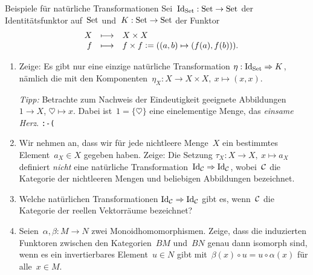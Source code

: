 \documentclass{uebblatt}
\begin{document}

\begin{aufgabe}{Beispiele für natürliche Transformationen}
Sei~$\mathrm{Id}_{\mathrm{Set}} : \mathrm{Set} \to \mathrm{Set}$ der Identitätsfunktor auf~$\mathrm{Set}$ und~$K : \mathrm{Set}
\to \mathrm{Set}$ der Funktor
\[ \begin{array}{@{}rrcl@{}}
  & X &\longmapsto& X \times X \\
  & f &\longmapsto& f \times f \defeq ((a,b) \mapsto (f(a),f(b))).
\end{array} \]
\begin{enumerate}
\item Zeige: Es gibt nur eine einzige natürliche Transformation $\eta : \mathrm{Id}_{\mathrm{Set}}
\Rightarrow K$, nämlich die mit den Komponenten~$\eta_X : X \to X \times X,\ x \mapsto (x,x)$.

{\tiny
\emph{Tipp:} Betrachte zum Nachweis der Eindeutigkeit geeignete Abbildungen $1 \to X$, $\heartsuit
\mapsto x$. Dabei ist~$1 = \{\heartsuit\}$ eine einelementige Menge, das
\emph{einsame Herz}. \texttt{:-(}\par}
\item Wir nehmen an, dass wir für jede nichtleere Menge~$X$ ein bestimmtes
Element~$a_X \in X$ gegeben haben. Zeige:
Die Setzung
$\tau_X : X \to X,\ x \mapsto a_X$
definiert \emph{nicht} eine natürliche Transformation~$\mathrm{Id}_{\mathcal{C}} \Rightarrow \mathrm{Id}_{\mathcal{C}}$,
wobei~$\mathcal{C}$ die Kategorie der nichtleeren Mengen und beliebigen Abbildungen
bezeichnet.
\item
Welche natürlichen Transformationen $\mathrm{Id}_{\mathcal{C}} \Rightarrow \mathrm{Id}_{\mathcal{C}}$ gibt es,
wenn~$\mathcal{C}$ die Kategorie der reellen Vektorräume bezeichnet?
\item Seien~$\alpha, \beta : M \to N$ zwei Monoidhomomorphismen. Zeige, dass
die induzierten Funktoren zwischen den Kategorien~$BM$ und~$BN$ genau dann
isomorph sind, wenn es ein invertierbares Element~$u \in N$ gibt mit~$\beta(x) \circ u = u
\circ \alpha(x)$ für alle~$x \in M$.
\end{enumerate}
\end{aufgabe}
\end{document}

